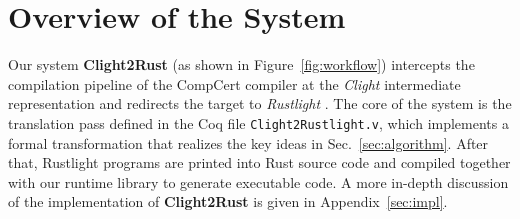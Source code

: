 \documentclass{llncs} %
\begin{document}




\section{Overview of the System}
\label{sec:overview}

Our system \textbf{Clight2Rust} (as shown in Figure~\ref{fig:workflow}) intercepts the compilation pipeline of the CompCert compiler \cite{Leroy2009} at the \emph{Clight} intermediate representation and redirects the target to \emph{Rustlight} \cite{Wu2025}. The core of the system is the translation pass defined in the Coq file \texttt{Clight2Rustlight.v}, which implements a formal transformation that realizes the key ideas in Sec.~\ref{sec:algorithm}. After that, Rustlight programs are printed into Rust source code and compiled together with our runtime library to generate executable code. A more in-depth discussion of the implementation of \textbf{Clight2Rust} is given in Appendix~\ref{sec:impl}.
\end{document}

